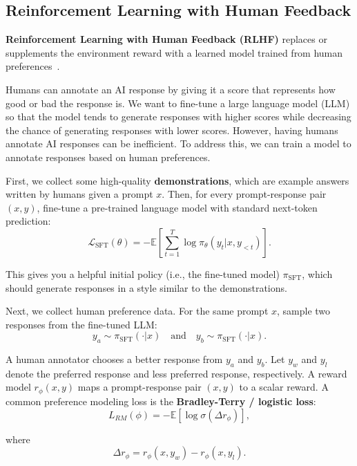 \subsection{Reinforcement Learning with Human Feedback}
\label{sec:rlhf}

\textbf{Reinforcement Learning with Human Feedback (RLHF)} replaces or supplements the environment reward with a learned model trained from human preferences~\cite{christiano2017deep}.

Humans can annotate an AI response by giving it a score that represents how good or bad the response is. We want to fine-tune a large language model (LLM) so that the model tends to generate responses with higher scores while decreasing the chance of generating responses with lower scores. However, having humans annotate AI responses can be inefficient. To address this, we can train a model to annotate responses based on human preferences.

First, we collect some high-quality \textbf{demonstrations}, which are example answers written by humans given a prompt \(x\). Then, for every prompt-response pair \((x, y)\), fine-tune a pre-trained language model with standard next-token prediction:
\begin{equation}
	\mathcal{L}_{\text{SFT}}(\theta) = -\mathbb{E} \left[ \sum_{t = 1}^{T}{ \log \pi_\theta (y_t | x, y_{<t}) } \right].
\end{equation}

This gives you a helpful initial policy (i.e., the fine-tuned model) \(\pi_{\text{SFT}}\), which should generate responses in a style similar to the demonstrations.

Next, we collect human preference data. For the same prompt \(x\), sample two responses from the fine-tuned LLM:
\[
	y_a \sim \pi_{\text{SFT}}(\cdot | x) \quad \text{and} \quad
	y_b \sim \pi_{\text{SFT}}(\cdot | x).
\]

A human annotator chooses a better response from \(y_a\) and \(y_b\). Let \(y_w\) and \(y_l\) denote the preferred response and less preferred response, respectively. A reward model \(r_\phi(x, y)\) maps a prompt-response pair \((x, y)\) to a scalar reward. A common preference modeling loss is the \textbf{Bradley-Terry / logistic loss}:
\begin{equation}
	L_{RM}(\phi) = - \mathbb{E} \left[ \log \sigma(\Delta r_\phi) \right],
\end{equation}

where
\begin{equation}
	\Delta r_\phi = r_\phi(x, y_w) - r_\phi(x, y_l).
\end{equation}

